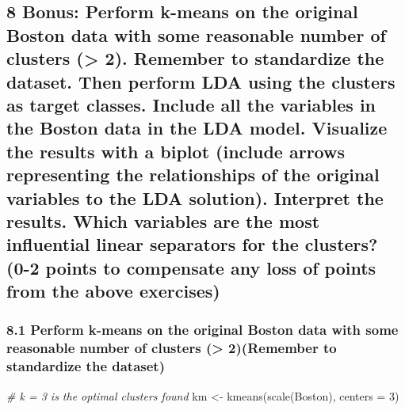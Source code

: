 \documentclass[
]{article}
\newenvironment{Shaded}{\begin{snugshade}}{\end{snugshade}}
\newcommand{\AttributeTok}[1]{\textcolor[rgb]{0.77,0.63,0.00}{#1}}
\newcommand{\CommentTok}[1]{\textcolor[rgb]{0.56,0.35,0.01}{\textit{#1}}}
\newcommand{\DecValTok}[1]{\textcolor[rgb]{0.00,0.00,0.81}{#1}}
\newcommand{\FunctionTok}[1]{\textcolor[rgb]{0.00,0.00,0.00}{#1}}
\newcommand{\NormalTok}[1]{#1}
\newcommand{\OtherTok}[1]{\textcolor[rgb]{0.56,0.35,0.01}{#1}}
\begin{document}
\hypertarget{bonus-perform-k-means-on-the-original-boston-data-with-some-reasonable-number-of-clusters-2.-remember-to-standardize-the-dataset.-then-perform-lda-using-the-clusters-as-target-classes.-include-all-the-variables-in-the-boston-data-in-the-lda-model.-visualize-the-results-with-a-biplot-include-arrows-representing-the-relationships-of-the-original-variables-to-the-lda-solution.-interpret-the-results.-which-variables-are-the-most-influential-linear-separators-for-the-clusters-0-2-points-to-compensate-any-loss-of-points-from-the-above-exercises}{%
\subsection{8 Bonus: Perform k-means on the original Boston data with
some reasonable number of clusters (\textgreater{} 2). Remember to
standardize the dataset. Then perform LDA using the clusters as target
classes. Include all the variables in the Boston data in the LDA model.
Visualize the results with a biplot (include arrows representing the
relationships of the original variables to the LDA solution). Interpret
the results. Which variables are the most influential linear separators
for the clusters? (0-2 points to compensate any loss of points from the
above
exercises)}\label{bonus-perform-k-means-on-the-original-boston-data-with-some-reasonable-number-of-clusters-2.-remember-to-standardize-the-dataset.-then-perform-lda-using-the-clusters-as-target-classes.-include-all-the-variables-in-the-boston-data-in-the-lda-model.-visualize-the-results-with-a-biplot-include-arrows-representing-the-relationships-of-the-original-variables-to-the-lda-solution.-interpret-the-results.-which-variables-are-the-most-influential-linear-separators-for-the-clusters-0-2-points-to-compensate-any-loss-of-points-from-the-above-exercises}}

\hypertarget{perform-k-means-on-the-original-boston-data-with-some-reasonable-number-of-clusters-2remember-to-standardize-the-dataset}{%
\subsubsection{8.1 Perform k-means on the original Boston data with some
reasonable number of clusters (\textgreater{} 2)(Remember to standardize
the
dataset)}\label{perform-k-means-on-the-original-boston-data-with-some-reasonable-number-of-clusters-2remember-to-standardize-the-dataset}}

\begin{Shaded}
\begin{Highlighting}[]
\CommentTok{\# k = 3 is the optimal clusters found}
\NormalTok{km }\OtherTok{\textless{}{-}} \FunctionTok{kmeans}\NormalTok{(}\FunctionTok{scale}\NormalTok{(Boston), }\AttributeTok{centers =} \DecValTok{3}\NormalTok{)}
\end{Highlighting}
\end{Shaded}
\end{document}
